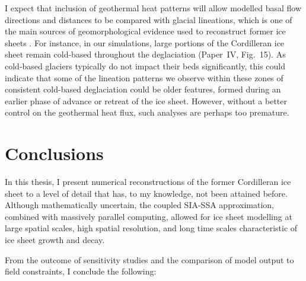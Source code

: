 \documentclass{article}
\newcommand{\CCYC}[0]{Paper~IV}     %
\begin{document}
I expect that inclusion of geothermal heat patterns will allow modelled basal
flow directions and distances to be compared with glacial lineations, which is
one of the main sources of geomorphological evidence used to reconstruct former
ice sheets \citep{Boulton.Clark.1990, Kleman.etal.1997, Kleman.etal.2010}. For
instance, in our simulations, large portions of the Cordilleran ice sheet
remain cold-based throughout the deglaciation (\CCYC, Fig.~15). As cold-based
glaciers typically do not impact their beds significantly, this could indicate
that some of the lineation patterns we observe within these zones of consistent
cold-based deglaciation could be older features, formed during an earlier phase
of advance or retreat of the ice sheet. However, without a better control on
the geothermal heat flux, such analyses are perhaps too premature.


\section{Conclusions}

In this thesis, I present numerical reconstructions of the former Cordilleran
ice sheet to a level of detail that has, to my knowledge, not been attained
before. Although mathematically uncertain, the coupled SIA-SSA approximation,
combined with massively parallel computing, allowed for ice sheet modelling at
large spatial scales, high spatial resolution, and long time scales
characteristic of ice sheet growth and decay.

From the outcome of sensitivity studies and the comparison of model output to
field constraints, I conclude the following:
\end{document}

